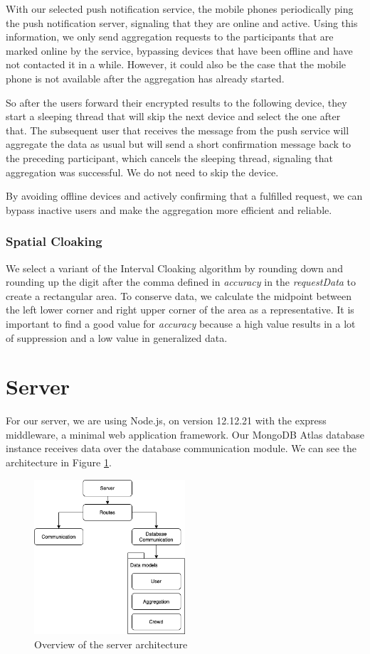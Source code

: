 With our selected push notification service, the mobile phones periodically ping the push notification server, signaling that they are online and active. Using this information, we only send aggregation requests to the participants that are marked online by the service, bypassing devices that have been offline and have not contacted it in a while. However, it could also be the case that the mobile phone is not available after the aggregation has already started.

So after the users forward their encrypted results to the following device, they start a sleeping thread that will skip the next device and select the one after that. The subsequent user that receives the message from the push service will aggregate the data as usual but will send a short confirmation message back to the preceding participant, which cancels the sleeping thread, signaling that aggregation was successful. We do not need to skip the device.

By avoiding offline devices and actively confirming that a fulfilled request, we can bypass inactive users and make the aggregation more efficient and reliable.

\subsubsection{Spatial Cloaking}
We select a variant of the Interval Cloaking algorithm by rounding down and rounding up the digit after the comma defined in \textit{accuracy} in the \textit{requestData} to create a rectangular area. To conserve data, we calculate the midpoint between the left lower corner and right upper corner of the area as a representative. It is important to find a good value for \textit{accuracy} because a high value results in a lot of suppression and a low value in generalized data. 

\section{Server}
For our server, we are using Node.js, on version 12.12.21 with the express \cite{express} middleware, a minimal web application framework. Our MongoDB Atlas database instance receives data over the database communication module. We can see the architecture in Figure \ref{fig:server}.

\begin{figure}[htpb]
  \centering
  \includegraphics[width=0.5\textwidth]{figures/server}
  \caption{Overview of the server architecture} \label{fig:server}
\end{figure}

